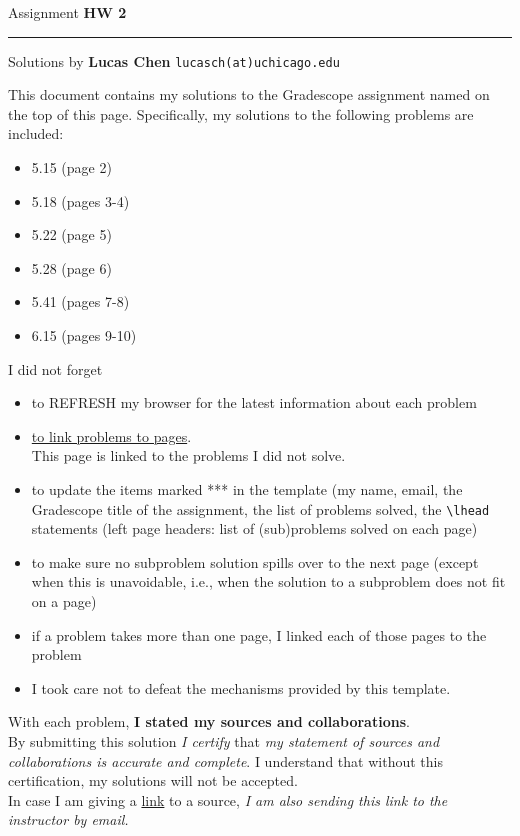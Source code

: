 \documentclass{amsart}
\begin{document}
\Large
\noindent
Assignment {\bf HW 2}   %

\medskip\noindent
\hrule


\medskip\noindent
Solutions by {\bf Lucas Chen} \qquad   %
  {\tt lucasch(at)uchicago.edu}      %

\vspace{0.5cm}

\noindent
This document contains my solutions to
the Gradescope assignment named on the top of this page.
Specifically, my solutions to the following problems
are included:

\vspace{0.4cm}
\begin{itemize}  %
	\item 5.15 \quad (page 2)
	\item 5.18 \quad (pages 3-4)
	\item 5.22 \quad (page 5)
	\item 5.28 \quad (page 6)
	\item 5.41 \quad (pages 7-8)
	\item 6.15 \quad (pages 9-10)
\end{itemize}

\vspace{0.5cm}

\noindent
I did not forget 
\begin{itemize}
  \item to REFRESH my browser for the latest information
   about each problem
  \item \underline{to link problems to pages}.\\
  This page is linked to the problems I did not solve.
\item to update the items marked *** in the template
  (my name, email, the Gradescope title of the assignment,
  the list of problems solved, the \verb>\lhead> statements
  (left page headers: list of (sub)problems solved on each page)
\item to make sure no subproblem solution spills over to the next page
  (except when this is unavoidable, i.e., when the solution to a
  subproblem does not fit on a page)
\item if a problem takes more than one page, I linked
  each of those pages to the problem
\item I took care not to defeat the mechanisms provided by this template.
\end{itemize}
  With each problem, {\bf I stated my sources and collaborations}.\\
  By submitting this solution \emph{I certify} that
  \emph{my statement of sources and collaborations is accurate and complete}.
  I understand that without this certification, my solutions will not be accepted.\\
  In case I am giving a \underline{link} to a source, \emph{I am also sending this link
  to the instructor by email.}
  
\end{document}
